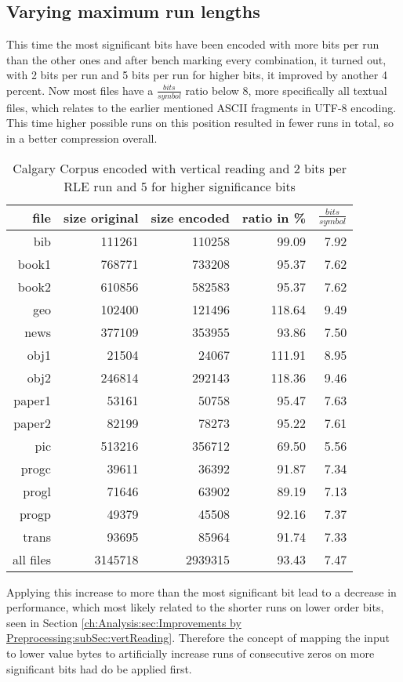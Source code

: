 \subsection{Varying maximum run lengths}
\label{ch:Conceptual Design:sec:var lengths}
\par{
This time the most significant bits have been encoded with more bits per run than the other ones and after bench marking every combination, it turned out, with 2 bits per run and 5 bits per run for higher bits, it improved by another 4 percent. Now most files have a $\frac{bits}{symbol}$ ratio below 8, more specifically all textual files, which relates to the earlier mentioned ASCII fragments in UTF-8 encoding. This time higher possible runs on this position resulted in fewer runs in total, so in a better compression overall.
\begin{table}[H]
	\centering
	\begin{tabular}{r|r|r|r|r}	
		file & size original & size encoded & ratio in \% & $\frac{bits}{symbol}$\\
		\hline
		bib & 111261 & 110258 & 99.09 & 7.92\\
		book1 & 768771 & 733208 & 95.37 & 7.62 \\
		book2 & 610856 & 582583 & 95.37 & 7.62\\
		geo & 102400 & 121496 & 118.64 & 9.49\\
		news & 377109 & 353955 & 93.86 & 7.50\\
		obj1 & 21504 & 24067 & 111.91 & 8.95\\
		obj2& 246814 & 292143 & 118.36 & 9.46\\		 
		paper1 & 53161 & 50758 & 95.47 & 7.63\\		 
		paper2& 82199 & 78273 & 95.22 & 7.61\\		 
		pic & 513216 & 356712 & 69.50 & 5.56\\		 
		progc & 39611 & 36392 & 91.87 & 7.34\\		 
		progl & 71646 & 63902 & 89.19 & 7.13\\		 
		progp & 49379 & 45508 & 92.16 & 7.37\\		 
		trans & 93695 & 85964 & 91.74 & 7.33\\
		\hline
		all files & 3145718 & 2939315 & 93.43 & 7.47
	\end{tabular}
	\caption{Calgary Corpus encoded with vertical reading and 2 bits per RLE run and 5 for higher significance bits}
\label{tab:t42 Calgary Corpus encoded with vertical reading and 2 bits per RLE run and 5 for higher significance bits}
\end{table}
}
\par{
Applying this increase to more than the most significant bit lead to a decrease in performance, which most likely related to the shorter runs on lower order bits, seen in Section \ref{ch:Analysis:sec:Improvements by Preprocessing:subSec:vertReading}. Therefore the concept of mapping the input to lower value bytes to artificially increase runs of consecutive zeros on more significant bits had do be applied first.
}

